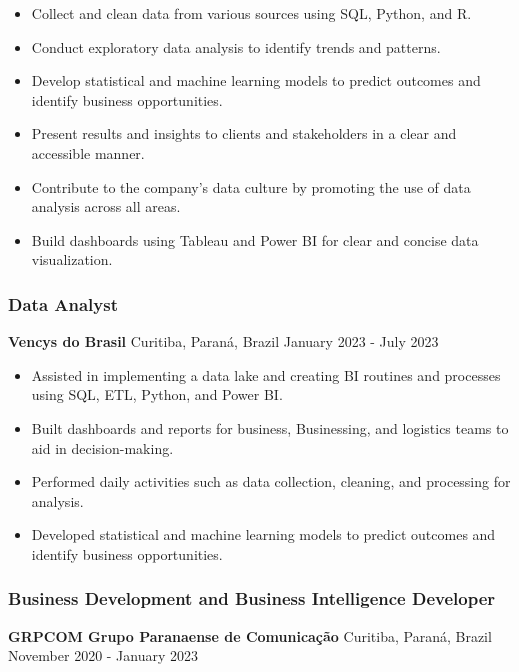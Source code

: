 \documentclass[
]{article}
\providecommand{\tightlist}{%
  \setlength{\itemsep}{0pt}\setlength{\parskip}{0pt}}
\begin{document}
\begin{itemize}
\tightlist
\item
  Collect and clean data from various sources using SQL, Python, and R.
\item
  Conduct exploratory data analysis to identify trends and patterns.
\item
  Develop statistical and machine learning models to predict outcomes
  and identify business opportunities.
\item
  Present results and insights to clients and stakeholders in a clear
  and accessible manner.
\item
  Contribute to the company's data culture by promoting the use of data
  analysis across all areas.
\item
  Build dashboards using Tableau and Power BI for clear and concise data
  visualization.
\end{itemize}

\subsubsection{Data Analyst}\label{data-analyst}

\textbf{Vencys do Brasil} \textbar{} Curitiba, Paraná, Brazil \textbar{}
January 2023 - July 2023

\begin{itemize}
\tightlist
\item
  Assisted in implementing a data lake and creating BI routines and
  processes using SQL, ETL, Python, and Power BI.
\item
  Built dashboards and reports for business, Businessing, and logistics
  teams to aid in decision-making.
\item
  Performed daily activities such as data collection, cleaning, and
  processing for analysis.
\item
  Developed statistical and machine learning models to predict outcomes
  and identify business opportunities.
\end{itemize}

\subsubsection{Business Development and Business Intelligence
Developer}\label{business-development-and-business-intelligence-developer}

\textbf{GRPCOM \textbar{} Grupo Paranaense de Comunicação} \textbar{}
Curitiba, Paraná, Brazil \textbar{} November 2020 - January 2023
\end{document}
